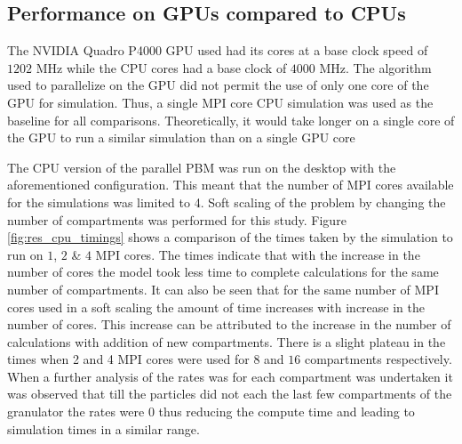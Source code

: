 \documentclass[preprint,10pt,authoryear,review]{elsarticle}
\begin{document}
\subsection{Performance on GPUs compared to CPUs}
The NVIDIA Quadro P4000 GPU used had its cores at a base clock speed of $1202$ MHz while
the CPU cores had a base clock of $4000$ MHz. The algorithm used to parallelize on the GPU 
did not permit the use of only one core of the GPU for simulation. Thus, a single MPI core 
CPU simulation was used as the baseline for all comparisons. Theoretically, it would take 
longer on a single core of the GPU to run a similar simulation than on a single GPU core

The CPU version of the parallel PBM was run on the desktop with the aforementioned 
configuration. This meant that the number of MPI cores available for the simulations 
was limited to 4. Soft scaling of the problem by changing the number of compartments 
was performed for this study. Figure \ref{fig:res_cpu_timings} shows a comparison of the times taken 
by the simulation to run on $1$, $2$ \& $4$ MPI cores. The times indicate that 
with the increase in the number of cores the model took less time to complete 
calculations for the same number of compartments. It can also be seen that for the 
same number of MPI cores used in a soft scaling the amount of time increases 
with increase in the number of cores. This increase can be attributed to the 
increase in the number of calculations with addition of new compartments. There is a 
slight plateau in the times when 2 and 4 MPI cores were used for $8$ and $16$ compartments 
respectively. When a further analysis of the rates was for each compartment was undertaken 
it was observed that till the particles did not each the last few compartments of the 
granulator the rates were $0$ thus reducing the compute time and leading to simulation
times in a similar range. 
\end{document}
